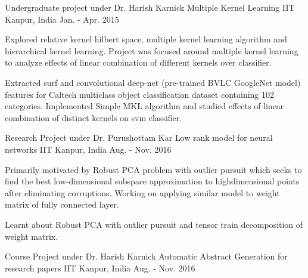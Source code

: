 \begin{cventries}
	
	\cventry
	{Undergraduate project under Dr. Harish Karnick} %
	{Multiple Kernel Learning} %
	{IIT Kanpur, India} %
	{Jan. - Apr. 2015} %
	{
		\begin{cvitems} %
			 \item {Explored relative kernel hilbert space, multiple kernel learning algorithm and hierarchical kernel learning. Project was focused around multiple kernel learning to analyze effects of linear combination of different kernels over classifier.}
			 \item {Extracted surf and convolutional deep-net (pre-trained BVLC GoogleNet model) features for Caltech multiclass object classification dataset containing 102 categories. Implemented Simple MKL algorithm and studied effects of linear combination of distinct kernels on svm classifier.}
		\end{cvitems}
	}
	
	\cventry
	{Research Project under Dr. Purushottam Kar} %
	{Low rank model for neural networks} %
	{IIT Kanpur, India} %
	{Aug. - Nov. 2016} %
	{
		\begin{cvitems} %
			\item { Primarily motivated by Robust PCA problem with outlier pursuit which seeks to find the best low-dimensional subspace approximation to highdimensional points after eliminating corruptions. Working on applying similar model to weight matrix of fully connected layer.}
			\item {Learnt about Robust PCA with outlier pursuit and tensor train decomposition of weight matrix.}
		\end{cvitems}
	}
	
	
	\cventry
	{Course Project under Dr. Harish Karnick} %
	{Automatic Abstract Generation for research papers} %
	{IIT Kanpur, India} %
	{Aug. - Nov. 2016} %
	{
		\begin{cvitems} %
		\end{cvitems}
	}
	

\end{cventries}
